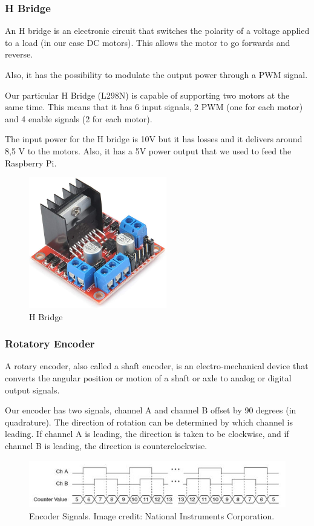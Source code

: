 \subsubsection{H Bridge}
An H bridge is an electronic circuit that switches the polarity of a
voltage applied to a load (in our case DC motors). This allows the motor to
go forwards and reverse.

Also, it has the possibility to modulate the output power through a PWM signal.

Our particular H Bridge (L298N) is capable of supporting two motors at the same time.
This means that it has 6 input signals, 2 PWM (one for each motor) and 4 enable signals
(2 for each motor).

The input power for the H bridge is 10V but it has losses and it delivers around 8,5 V to the motors.
Also, it has a 5V power output that we used to feed the Raspberry Pi.


\begin{figure}[H]
    \centering
    \includegraphics[width=6cm]{img/components/Hbridge.jpg}
    \caption{H Bridge}
    \label{fig: H Bridge}
\end{figure}


\subsubsection{Rotatory Encoder}
A rotary encoder, also called a shaft encoder, is an electro-mechanical device that converts the
angular position or motion of a shaft or axle to analog or digital output signals.

Our encoder has two signals, channel A and channel B offset by 90
degrees (in quadrature). The direction of rotation can be determined
by which channel is leading. If channel A is leading, the
direction is taken to be clockwise, and if channel B is
leading, the direction is counterclockwise. 

\begin{figure}[H]
    \centering
    \includegraphics[width=14cm]{img/X4-Encoding.jpg}
    \caption{Encoder Signals. Image credit: National Instruments Corporation.}
    \label{fig: Encoder}
\end{figure}


